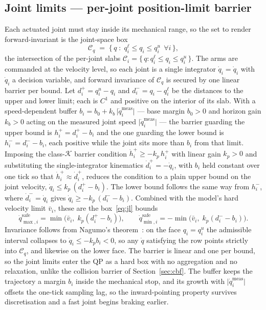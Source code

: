 \documentclass[12pt,a4paper,twoside,openright]{report}
\newcommand{\qdot}{\dot{q}}
\begin{document}
\subsection{Joint limits --- per-joint position-limit barrier}
\label{sec:jl}

Each actuated joint must stay inside its mechanical range, so the set to render forward-invariant is the joint-space box
\begin{equation}
\mathcal{C}_q \;=\; \bigl\{\, q \;:\; q_i^{\ell} \le q_i \le q_i^{u}\ \ \forall i \,\bigr\},
\label{eq:jlset}
\end{equation}
the intersection of the per-joint slabs $\mathcal{C}_i = \{\,q : q_i^{\ell} \le q_i \le q_i^{u}\,\}$. The arms are commanded at the velocity level, so each joint is a single integrator $\dot{q}_i = \qdot_i$ with $\qdot_i$ a decision variable, and forward invariance of $\mathcal{C}_q$ is secured by one linear barrier per bound. Let $d_i^{+} = q_i^{u} - q_i$ and $d_i^{-} = q_i - q_i^{\ell}$ be the distances to the upper and lower limit; each is $C^1$ and positive on the interior of its slab. With a speed-dependent buffer $b_i = b_0 + k_b\,\lvert\qdot_i^{\text{meas}}\rvert$ --- base margin $b_0 > 0$ and horizon gain $k_b > 0$ acting on the measured joint speed $\lvert\qdot_i^{\text{meas}}\rvert$ --- the barrier guarding the upper bound is $h_i^{+} = d_i^{+} - b_i$ and the one guarding the lower bound is $h_i^{-} = d_i^{-} - b_i$, each positive while the joint sits more than $b_i$ from that limit. Imposing the class-$\mathcal{K}$ barrier condition $\dot{h}_i^{+} \ge -k_p\,h_i^{+}$ with linear gain $k_p > 0$ and substituting the single-integrator kinematics $\dot{d}_i^{+} = -\qdot_i$, with $b_i$ held constant over one tick so that $\dot{h}_i^{+} \approx \dot{d}_i^{+}$, reduces the condition to a plain upper bound on the joint velocity, $\qdot_i \le k_p\,(d_i^{+} - b_i)$. The lower bound follows the same way from $h_i^{-}$, where $\dot{d}_i^{-} = \qdot_i$ gives $\qdot_i \ge -k_p\,(d_i^{-} - b_i)$. Combined with the model's hard velocity limit $\bar{v}_i$, these are the box~\eqref{eq:jl} bounds
\begin{equation}
\qdot_{\max,i}^{\text{safe}} = \min\!\bigl(\bar{v}_i,\; k_p(d_i^{+} - b_i)\bigr),
\qquad
\qdot_{\min,i}^{\text{safe}} = -\min\!\bigl(\bar{v}_i,\; k_p(d_i^{-} - b_i)\bigr).
\label{eq:jlbrake}
\end{equation}
Invariance follows from Nagumo's theorem~\cite{blanchini1999,ames2019ecc}: on the face $q_i = q_i^{u}$ the admissible interval collapses to $\qdot_i \le -k_p b_i < 0$, so any $\qdot$ satisfying the row points strictly into $\mathcal{C}_q$, and likewise on the lower face. The barrier is linear and one per bound, so the joint limits enter the QP as a hard box with no aggregation and no relaxation, unlike the collision barrier of Section~\ref{sec:cbf}. The buffer keeps the trajectory a margin $b_i$ inside the mechanical stop, and its growth with $\lvert\qdot_i^{\text{meas}}\rvert$ offsets the one-tick sampling lag, so the inward-pointing property survives discretisation and a fast joint begins braking earlier.
\end{document}
